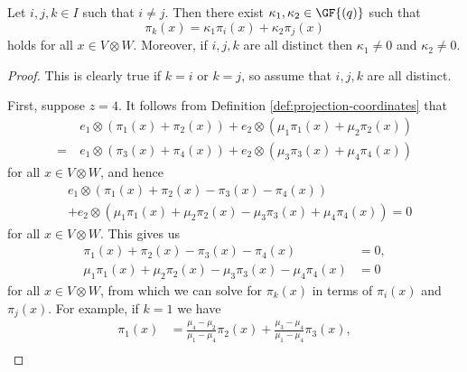 \begin{lemma} \label{lm:projection-relations}
Let $i, j, k \in I$ such that $i \neq j$. Then there exist $\kappa_1, \kappa_2 \in \GF{\left(q \right)}$ such that
\begin{displaymath}
    \pi_k{\left(x \right)} = \kappa_1 \pi_i{\left(x \right)} + \kappa_2 \pi_j{\left(x \right)}
\end{displaymath}
holds for all $x \in V \otimes W$. Moreover, if $i, j, k$ are all distinct then $\kappa_1 \neq 0$ and $\kappa_2 \neq 0$.
\end{lemma}
\begin{proof}
This is clearly true if $k=i$ or $k=j$, so assume that $i, j, k$ are all distinct.

First, suppose $z=4$. It follows from Definition \ref{def:projection-coordinates} that
\begin{align*}
    &e_1 \otimes \left(\pi_1{\left(x \right)} + \pi_2{\left(x \right)}\right) + e_2 \otimes \left(\mu_1 \pi_1{\left(x \right)} + \mu_2 \pi_2{\left(x \right)}\right) \\
    =\ &e_1 \otimes \left(\pi_3{\left(x \right)} + \pi_4{\left(x \right)}\right) + e_2 \otimes \left(\mu_3 \pi_3{\left(x \right)} + \mu_4 \pi_4{\left(x \right)}\right)
\end{align*}
for all $x \in V \otimes W$, and hence
\begin{align*}
    &e_1 \otimes \left(\pi_1{\left(x \right)} + \pi_2{\left(x \right)} - \pi_3{\left(x \right)} - \pi_4{\left(x \right)}\right) \\ 
    &+ e_2 \otimes \left(\mu_1 \pi_1{\left(x \right)} + \mu_2 \pi_2{\left(x \right)} - \mu_3 \pi_3{\left(x \right)} + \mu_4 \pi_4{\left(x \right)}\right) = 0
\end{align*}
for all $x \in V \otimes W$.
This gives us
\begin{align}
    \pi_1{\left(x \right)} + \pi_2{\left(x \right)} - \pi_3{\left(x \right)} - \pi_4{\left(x \right)} &= 0, \label{eqn:projection-relation-unsolved-1} \\
    \mu_1 \pi_1{\left(x \right)} + \mu_2 \pi_2{\left(x \right)} - \mu_3 \pi_3{\left(x \right)} - \mu_4 \pi_4{\left(x \right)} &= 0 \label{eqn:projection-relation-unsolved-2}
\end{align}
for all $x \in V \otimes W$, from which we can solve for $\pi_k{\left(x \right)}$ in terms of $\pi_i{\left(x \right)}$ and $\pi_j{\left(x \right)}$. For example, if $k=1$ we have
\begin{align*}
    \pi_1{\left(x \right)} &= \frac{\mu_4 - \mu_2}{\mu_1 - \mu_4} \pi_2{\left(x \right)} + \frac{\mu_3 - \mu_4}{\mu_1 - \mu_4} \pi_3{\left(x \right)}, \\

\end{align*}
\end{proof}
